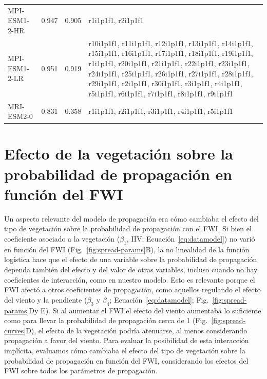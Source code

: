\begin{table}[htbp]
\begin{tabular}{L{3cm} C{1.5cm} C{1.5cm} L{8cm}}
MPI-ESM1-2-HR & 0.947 & 0.905 & r1i1p1f1, r2i1p1f1\\
MPI-ESM1-2-LR & 0.951 & 0.919 & r10i1p1f1, r11i1p1f1, r12i1p1f1, r13i1p1f1, r14i1p1f1, r15i1p1f1, r16i1p1f1, r17i1p1f1, r18i1p1f1, r19i1p1f1, r1i1p1f1, r20i1p1f1, r21i1p1f1, r22i1p1f1, r23i1p1f1, r24i1p1f1, r25i1p1f1, r26i1p1f1, r27i1p1f1, r28i1p1f1, r29i1p1f1, r2i1p1f1, r30i1p1f1, r3i1p1f1, r4i1p1f1, r5i1p1f1, r6i1p1f1, r7i1p1f1, r8i1p1f1, r9i1p1f1\\
MRI-ESM2-0 & 0.831 & 0.358 & r1i1p1f1, r2i1p1f1, r3i1p1f1, r4i1p1f1, r5i1p1f1\\
\bottomrule
\end{tabular}
\end{table}

\FloatBarrier

\section{Efecto de la vegetación sobre la probabilidad de propagación en función del FWI}\label{append:spread-veg-effects}

Un aspecto relevante del modelo de propagación era cómo cambiaba el efecto del tipo de vegetación sobre la probabilidad de propagación con el FWI. Si bien el coeficiente asociado a la vegetación ($\beta_1$, IIV; Ecuación~\ref{eq:datamodel}) no varió en función del FWI (Fig.~\ref{fig:spread-params}B), la no linealidad de la función logística hace que el efecto de una variable sobre la probabilidad de propagación dependa también del efecto y del valor de otras variables, incluso cuando no hay coeficientes de interacción, como en nuestro modelo. Esto es relevante porque el FWI afectó a otros coeficientes de propagación, como aquellos regulando el efecto del viento y la pendiente ($\beta_3$ y $\beta_4$; Ecuación~\ref{eq:datamodel}; Fig.~\ref{fig:spread-params}Dy E). Si al aumentar el FWI el efecto del viento aumentaba lo suficiente como para llevar la probabilidad de propagación cerca de 1 (Fig.~\ref{fig:spread-curves}D), el efecto de la vegetación podría atenuarse, al menos considerando propagación a favor del viento. Para evaluar la posibilidad de esta interacción implícita, evaluamos cómo cambiaba el efecto del tipo de vegetación sobre la probabilidad de propagación en función del FWI, considerando los efectos del FWI sobre todos los parámetros de propagación. 

